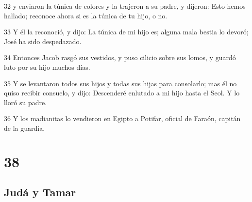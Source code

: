 \par 32 y enviaron la túnica de colores y la trajeron a su padre, y dijeron: Esto hemos hallado; reconoce ahora si es la túnica de tu hijo, o no.
\par 33 Y él la reconoció, y dijo: La túnica de mi hijo es; alguna mala bestia lo devoró; José ha sido despedazado.
\par 34 Entonces Jacob rasgó sus vestidos, y puso cilicio sobre sus lomos, y guardó luto por su hijo muchos días.
\par 35 Y se levantaron todos sus hijos y todas sus hijas para consolarlo; mas él no quiso recibir consuelo, y dijo: Descenderé enlutado a mi hijo hasta el Seol. Y lo lloró su padre.
\par 36 Y los madianitas lo vendieron en Egipto a Potifar, oficial de Faraón, capitán de la guardia.

\chapter{38}

\section*{Judá y Tamar}

